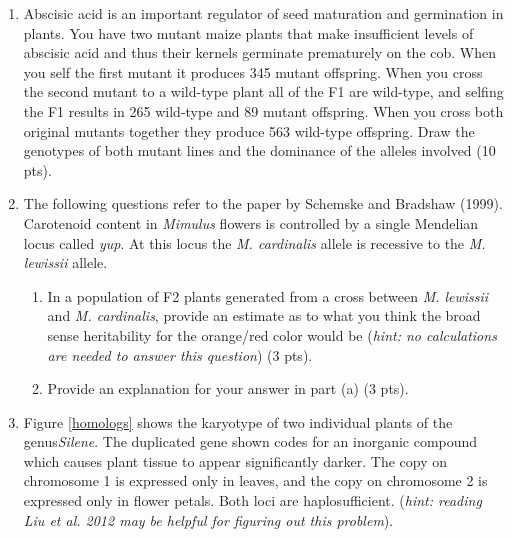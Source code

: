 \documentclass[]{article}
\begin{document}
\begin{enumerate}
\newpage
\item Abscisic acid is an important regulator of seed maturation and germination in plants. You have two mutant maize plants that make insufficient levels of abscisic acid and thus their kernels germinate prematurely on the cob. When you self the first mutant it produces 345 mutant offspring. When you cross the second mutant to a wild-type plant all of the F1 are wild-type, and selfing the F1 results in 265 wild-type and 89 mutant offspring.  When you cross both original mutants together they produce 563 wild-type offspring.  Draw the genotypes of both mutant lines and the dominance of the alleles involved (10 pts).

\newpage
\item The following questions refer to the paper by Schemske and Bradshaw (1999). Carotenoid content in \emph{Mimulus} flowers is controlled by a single Mendelian locus called \emph{yup}. At this locus the \emph{M. cardinalis} allele is recessive to the \emph{M. lewissii} allele. 
\begin{enumerate}
\item In a population of F2 plants generated from a cross between \emph{M. lewissii}  and \emph{M. cardinalis}, provide an estimate as to what you think the broad sense heritability for the orange/red color would be (\emph{hint: no calculations are needed to answer this question}) (3 pts).
\item Provide an explanation for your answer in part (a) (3 pts).
\end{enumerate}

\newpage
\item Figure \ref{homologs} shows the karyotype of two individual plants of the genus\emph{Silene}.  The duplicated gene shown codes for an inorganic compound which causes plant tissue to appear significantly darker. The copy on chromosome 1 is expressed only in leaves, and the copy on chromosome 2 is expressed only in flower petals. Both loci are haplosufficient. (\emph{hint: reading Liu et al. 2012 may be helpful for figuring out this problem}).


\end{enumerate}
\end{document}
